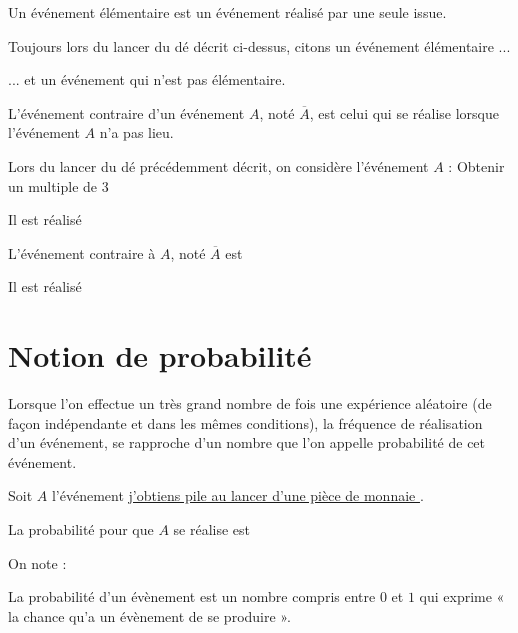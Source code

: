 \documentclass[a4paper,10pt]{report}
\begin{document}
\begin{rem}
Un événement élémentaire est un événement réalisé par une seule issue.
\end{rem}

\begin{ex}
Toujours lors du lancer du dé décrit ci-dessus, citons un événement élémentaire ...

\medskip \noindent\grandscarreaux{\linewidth}{1.6cm}
... et un événement qui n'est pas élémentaire.

\medskip \noindent\grandscarreaux{\linewidth}{1.6cm}
\end{ex}

\begin{defn}
L'événement contraire d'un événement $A$, noté $\overline{A}$, est celui qui se réalise lorsque l'événement $A$ n'a pas lieu.
\end{defn}

\begin{ex} Lors du lancer du dé précédemment décrit, on considère l'événement $A$ : \og Obtenir un multiple de 3 \fg{}

\medskip
\noindent Il est réalisé \dotfill

\medskip
\noindent L'événement contraire à $A$, noté $\overline{A}$ est \dotfill

\medskip
\noindent Il est réalisé \dotfill
\end{ex}

\section{Notion de probabilité}

\begin{defn}
Lorsque l'on effectue un très grand nombre de fois une expérience aléatoire (de façon indépendante et dans les mêmes conditions), la fréquence de réalisation d'un événement, se rapproche d'un nombre que l'on appelle probabilité de cet événement.
\end{defn}

\begin{ex}
Soit $A$ l'événement \href{https://fr.piliapp.com/random/coin/}{\og j'obtiens pile au lancer d'une pièce de monnaie \fg{}}.

\medskip
\noindent La probabilité pour que $A$ se réalise est \dotfill

\medskip
\noindent On note : \dotfill
\end{ex}

\begin{prop}
La probabilité d'un évènement est un nombre compris entre $0$ et $1$ qui exprime « la chance qu'a un évènement de se produire ».
\end{prop}
\end{document}
